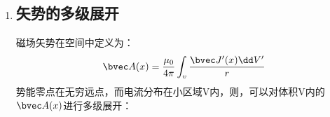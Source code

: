 \begin{enumerate}
\item \subsection{矢势的多级展开}
磁场矢势在空间中定义为：
\begin{equation}
\bvec A(x)=\dfrac {\mu_0}{4\pi} \int_v \dfrac{ \bvec J^{\prime}(x)\dd V^{\prime}}{r}
\end{equation}
势能零点在无穷远点，而电流分布在小区域V内，则，可以对体积V内的$\bvec A(x)$进行多级展开：
\begin{equation}

\end{equation}
\end{enumerate}

